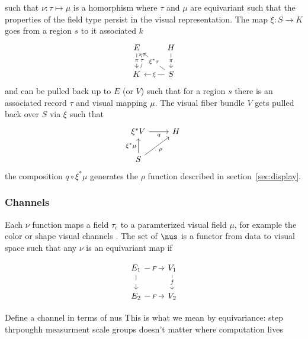 \documentclass[../main.tex]{subfiles}
\begin{document}
such that $\nu: \tau \mapsto \mu$ is a homorphism where $\tau$ and $\mu$ are equivariant such that the properties of the field type persist in the visual representation. The map $\xi: S \rightarrow K$ goes from a region $s$ to it associated $k$ 
\begin{equation}
    \begin{tikzcd}
        E \arrow[d, "\pi" description]              & H \arrow[d, "\pi" description]                                    \\
        K \arrow[u, "\tau" description, bend right] & S \arrow[l, "\xi" description] \arrow[lu, "\xi^*\tau" description]
        \end{tikzcd}
\end{equation}
and can be pulled back up to $E$ (or $V$) such that for a region $s$ there is an associated record $\tau$ and visual mapping $\mu$. The visual fiber bundle $V$ gets pulled back over $S$ via $\xi$ such that 
\begin{equation}
    \begin{tikzcd}
        \xi^*V \arrow[r, "q"']                      & H \\
        S \arrow[u, "\xi^*\mu"] \arrow[ru, "\rho"'] &  
        \end{tikzcd}
\end{equation}
the composition $q \circ \xi^*\mu$ generates the $\rho$ function described in section~\ref{sec:display}. 



\subsubsection{Channels}
Each $\nu$ function maps a field $\tau_c$ to a paramterized visual field $\mu$, for example the color or shape visual channels \cite{bertinIIPropertiesGraphic2011,munznerMarksChannels}. The set of $\nus$ is a functor from data to visual space such that any $\nu$ is an equivariant map if 

\begin{equation}
    \begin{tikzcd}
        E_1 \arrow[r, "F" description] \arrow[d, "" description] & V_1 \arrow[d, "f" description] \\
        E_2 \arrow[r, "F" description]                            & V_2                           
    \end{tikzcd}
\end{equation}

Define a channel in terms of nus
This is what we mean by equivariance: 
step thrpoughh measurment scale groups
doesn't matter where computation lives
\end{document}
